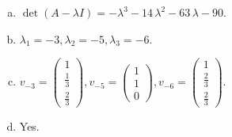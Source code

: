 \begin{questions}
\begin{solution}
\begin{enumerate}[(a)]
\item $\det(A-\lambda I)=-{\lambda}^{3} - 14 \, {\lambda}^{2} - 63 \, {\lambda} - 90$.
\item ${\lambda}_1=-3, {\lambda}_2=-5, {\lambda}_3=-6$.
\item $v_{-3}=\left(\begin{array}{r}
1 \\
\frac{1}{3} \\
\frac{2}{3}
\end{array}\right), v_{-5}=\left(\begin{array}{r}
1 \\
1 \\
0
\end{array}\right), v_{-6}=\left(\begin{array}{r}
1 \\
\frac{2}{3} \\
\frac{2}{3}
\end{array}\right)$.
\item Yes.
\end{enumerate}
\end{solution}

\end{questions}

\newpage


\begin{center}
\end{center}

